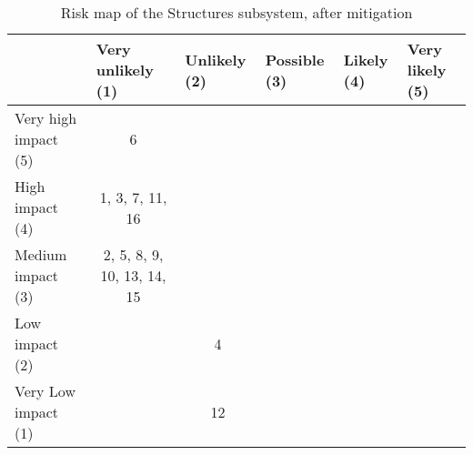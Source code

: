 \begin{table}[H]
\centering
\caption{Risk map of the Structures subsystem, after mitigation}
\label{tab:risk-map-struc-mitig}\begin{tabular}{l|c|c|c|c|c|}
\cline{2-6}
& \multicolumn{1}{l|}{Very unlikely (1)} & \multicolumn{1}{l|}{Unlikely (2)} & \multicolumn{1}{l|}{Possible (3)} & \multicolumn{1}{l|}{Likely (4)} & \multicolumn{1}{l|}{Very likely (5)} \\ \hline
\multicolumn{1}{|l|}{Very high impact (5)} & \cellcolor{rm-3}6 & \cellcolor{rm-3} & \cellcolor{rm-3} & \cellcolor{rm-3} & \cellcolor{rm-3}\\ \hline 
\multicolumn{1}{|l|}{High impact (4)} & \cellcolor{rm-2}1, 3, 7, 11, 16 & \cellcolor{rm-2} & \cellcolor{rm-2} & \cellcolor{rm-3} & \cellcolor{rm-3}\\ \hline 
\multicolumn{1}{|l|}{Medium impact (3)} & \cellcolor{rm-0}2, 5, 8, 9, 10, 13, 14, 15 & \cellcolor{rm-1} & \cellcolor{rm-1} & \cellcolor{rm-2} & \cellcolor{rm-3}\\ \hline 
\multicolumn{1}{|l|}{Low impact (2)} & \cellcolor{rm-0} & \cellcolor{rm-0}4 & \cellcolor{rm-1} & \cellcolor{rm-2} & \cellcolor{rm-3}\\ \hline 
\multicolumn{1}{|l|}{Very Low impact (1)} & \cellcolor{rm-0} & \cellcolor{rm-0}12 & \cellcolor{rm-0} & \cellcolor{rm-2} & \cellcolor{rm-3}\\ \hline 
\end{tabular} 
\end{table}

